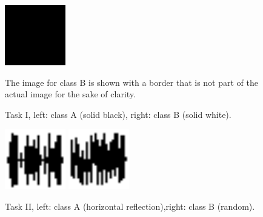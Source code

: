 \documentclass{article}
\begin{document}
\clearpage
{}
\pagestyle{empty}

\clearpage
\begin{figure}[h]
  \centering
  \includegraphics[width=100px]{solidcolor-example-A.png}
  \hspace{100px}
  {%
    \setlength{\fboxrule}{1pt}%
  }%
  \label{fig:solidcolor-example}
  \caption{Task I, left: class A (solid black), right: class B (solid white).}
  The image for class B is shown with a border that is not part of the actual image for the sake of clarity.
\end{figure}

\vspace{4cm}

\begin{figure}[h]
  \centering
  \includegraphics[width=100px]{reflection-example-A.png}
  \hspace{100px}
  \includegraphics[width=100px]{reflection-example-B.png}
  \label{fig:reflection-example}
  \caption{Task II, left: class A (horizontal reflection),\newline right: class B (random).}
\end{figure}
\end{document}
